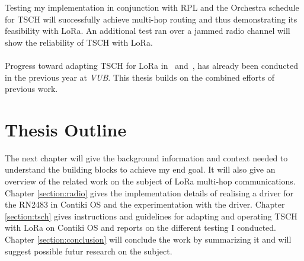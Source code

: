 Testing my implementation in conjunction with RPL and the Orchestra schedule
for TSCH will successfully achieve multi-hop routing and thus demonstrating its
feasibility with LoRa.
An additional test ran over a jammed radio channel will show the reliability of
TSCH with LoRa.

\paragraph{}

Progress toward adapting TSCH for LoRa in~\cite{8847137} and~\cite{njomgang_2018},
has already been conducted in the previous year at \emph{VUB}.
This thesis builds on the combined efforts of previous work.

\section{Thesis Outline}

The next chapter will give the background information and context needed to
understand the building blocks to achieve my end goal.
It will also give an overview of the related work on the subject of
LoRa multi-hop communications.
Chapter \ref{section:radio} gives the implementation details of realising a driver for the
RN2483 in Contiki OS and the experimentation with the driver.
Chapter \ref{section:tsch} gives instructions and guidelines for adapting and
operating TSCH with LoRa on Contiki OS and reports on the different testing I conducted.
Chapter \ref{section:conclusion} will conclude the work by summarizing it and
will suggest possible futur research on the subject.
